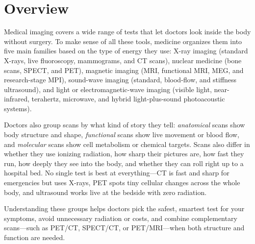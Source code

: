 \label{ch:infographic-imaging-classification}

\section{Overview}

Medical imaging covers a wide range of tests that let doctors look inside the body without surgery. To make sense of all these tools, medicine organizes them into five main families based on the type of energy they use: X-ray imaging (standard X-rays, live fluoroscopy, mammograms, and CT scans), nuclear medicine (bone scans, SPECT, and PET), magnetic imaging (MRI, functional MRI, MEG, and research-stage MPI), sound-wave imaging (standard, blood-flow, and stiffness ultrasound), and light or electromagnetic-wave imaging (visible light, near-infrared, terahertz, microwave, and hybrid light-plus-sound photoacoustic systems).

Doctors also group scans by what kind of story they tell: \emph{anatomical} scans show body structure and shape, \emph{functional} scans show live movement or blood flow, and \emph{molecular} scans show cell metabolism or chemical targets. Scans also differ in whether they use ionizing radiation, how sharp their pictures are, how fast they run, how deeply they see into the body, and whether they can roll right up to a hospital bed. No single test is best at everything---CT is fast and sharp for emergencies but uses X-rays, PET spots tiny cellular changes across the whole body, and ultrasound works live at the bedside with zero radiation.

Understanding these groups helps doctors pick the safest, smartest test for your symptoms, avoid unnecessary radiation or costs, and combine complementary scans---such as PET/CT, SPECT/CT, or PET/MRI---when both structure and function are needed.

